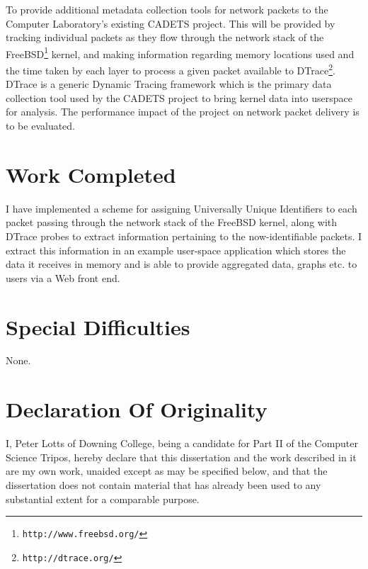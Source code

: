 \documentclass[a4paper,12pt,twoside,openright]{report}
\begin{document}
	To provide additional metadata collection tools for network packets to the Computer Laboratory's existing CADETS project. This will be provided by tracking individual packets as they flow through the network stack of the FreeBSD\footnote{\texttt{http://www.freebsd.org/}} kernel, and making information regarding memory locations used and the time taken by each layer to process a given packet available to DTrace\footnote{\texttt{http://dtrace.org/}}. DTrace is a generic Dynamic Tracing framework which is the primary data collection tool used by the CADETS project to bring kernel data into userspace for analysis. The performance impact of the project on network packet delivery is to be evaluated.
	
	
	\section*{Work Completed}
	
	I have implemented a scheme for assigning Universally Unique Identifiers to each packet passing through the network stack of the FreeBSD kernel, along with DTrace probes to extract information pertaining to the now-identifiable packets. I extract this information in an example user-space application which stores the data it receives in memory and is able to provide aggregated data, graphs etc. to users via a Web front end.
	
	\section*{Special Difficulties}
	
	None.
	
	\newpage
	\section*{Declaration Of Originality}
	
	I, Peter Lotts of Downing College, being a candidate for Part II of
	the Computer Science Tripos, hereby declare
	that this dissertation and the work described in it are my own work,
	unaided except as may be specified below, and that the dissertation
	does not contain material that has already been used to any substantial
	extent for a comparable purpose.
	
	\bigskip
	
	\medskip
	
	\tableofcontents
	
\end{document}

